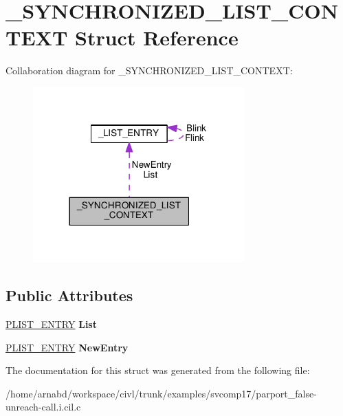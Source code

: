 \hypertarget{struct__SYNCHRONIZED__LIST__CONTEXT}{}\section{\+\_\+\+S\+Y\+N\+C\+H\+R\+O\+N\+I\+Z\+E\+D\+\_\+\+L\+I\+S\+T\+\_\+\+C\+O\+N\+T\+E\+X\+T Struct Reference}
\label{struct__SYNCHRONIZED__LIST__CONTEXT}


Collaboration diagram for \+\_\+\+S\+Y\+N\+C\+H\+R\+O\+N\+I\+Z\+E\+D\+\_\+\+L\+I\+S\+T\+\_\+\+C\+O\+N\+T\+E\+X\+T\+:
\nopagebreak
\begin{figure}[H]
\begin{center}
\leavevmode
\includegraphics[width=230pt]{struct__SYNCHRONIZED__LIST__CONTEXT__coll__graph}
\end{center}
\end{figure}
\subsection*{Public Attributes}
\begin{DoxyCompactItemize}
\item 
\hypertarget{struct__SYNCHRONIZED__LIST__CONTEXT_a7599b1326575a64736df50298c14a806}{}\hyperlink{struct__LIST__ENTRY}{P\+L\+I\+S\+T\+\_\+\+E\+N\+T\+R\+Y} {\bfseries List}\label{struct__SYNCHRONIZED__LIST__CONTEXT_a7599b1326575a64736df50298c14a806}

\item 
\hypertarget{struct__SYNCHRONIZED__LIST__CONTEXT_ad95dfa13cf045dfd8fd398f488af33ce}{}\hyperlink{struct__LIST__ENTRY}{P\+L\+I\+S\+T\+\_\+\+E\+N\+T\+R\+Y} {\bfseries New\+Entry}\label{struct__SYNCHRONIZED__LIST__CONTEXT_ad95dfa13cf045dfd8fd398f488af33ce}

\end{DoxyCompactItemize}


The documentation for this struct was generated from the following file\+:\begin{DoxyCompactItemize}
\item 
/home/arnabd/workspace/civl/trunk/examples/svcomp17/parport\+\_\+false-\/unreach-\/call.\+i.\+cil.\+c\end{DoxyCompactItemize}
